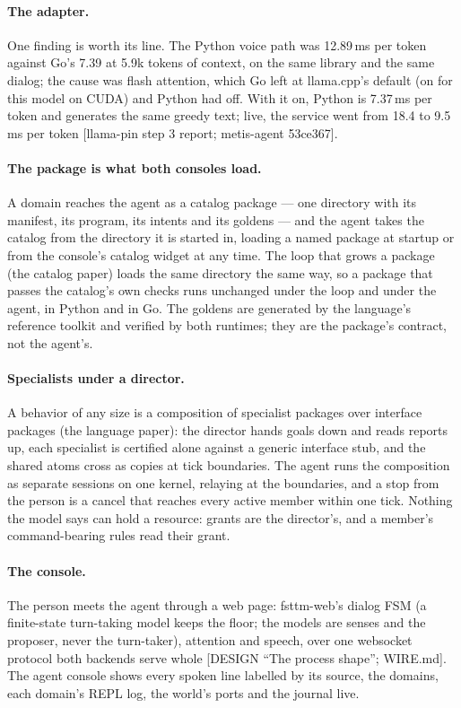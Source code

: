 \documentclass[11pt]{article}
\newcommand{\src}[1]{{\footnotesize\textsf{[#1]}}}
\begin{document}
\paragraph{The adapter.} One finding is worth its line. The Python voice path was 12.89\,ms
per token against Go's 7.39 at 5.9k tokens of context, on the same library and the same
dialog; the cause was flash attention, which Go left at llama.cpp's default (on for this
model on CUDA) and Python had off. With it on, Python is 7.37\,ms per token and generates the
same greedy text; live, the service went from 18.4 to 9.5\,ms per token \src{llama-pin step
3 report; metis-agent 53ce367}.

\paragraph{The package is what both consoles load.} A domain reaches the agent as a
catalog package --- one directory with its manifest, its program, its intents and its
goldens --- and the agent takes the catalog from the directory it is started in, loading a
named package at startup or from the console's catalog widget at any time. The loop that
grows a package (the catalog paper) loads the same directory the same way, so a package
that passes the catalog's own checks runs unchanged under the loop and under the agent, in
Python and in Go. The goldens are generated by the language's reference toolkit and
verified by both runtimes; they are the package's contract, not the agent's.

\paragraph{Specialists under a director.} A behavior of any size is a composition of
specialist packages over interface packages (the language paper): the director hands goals
down and reads reports up, each specialist is certified alone against a generic interface
stub, and the shared atoms cross as copies at tick boundaries. The agent runs the
composition as separate sessions on one kernel, relaying at the boundaries, and a stop from
the person is a cancel that reaches every active member within one tick. Nothing the model
says can hold a resource: grants are the director's, and a member's command-bearing rules
read their grant.

\paragraph{The console.} The person meets the agent through a web page: fsttm-web's
dialog FSM (a finite-state turn-taking model keeps the floor; the models are senses and the
proposer, never the turn-taker), attention and speech, over one websocket protocol both
backends serve whole \src{DESIGN ``The process shape''; WIRE.md}. The agent console shows
every spoken line labelled by its source, the domains, each domain's REPL log, the world's
ports and the journal live.
\end{document}
